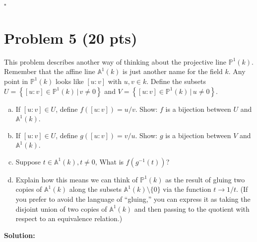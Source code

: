 \documentclass[12pt]{article}
\newcommand{\lc}{\left\{}
\newcommand{\rc}{\right\}}
\begin{document}
\hfill$\square$




\newpage


\section*{Problem 5 \small{(20 pts)}} 


This problem describes another way of thinking about the projective line $\mathbb{P}^1(k)$. Remember that the affine line $\mathbb{A}^1(k)$ is just another name for the field $k$. Any point in $\mathbb{P}^1(k)$ looks like $[u:v]$ with $u,v \in k$. Define the subsets
$ U = \lc [u:v]\in \mathbb{P}^1(k) \,\vert\, v \neq 0  \rc$ and
$ V = \lc [u:v]\in \mathbb{P}^1(k) \,\vert\, u \neq 0  \rc.$
\begin{enumerate}[(a)]
	\item If $[u:v] \in U$, define $f([u:v]) = u/v$. Show: $f$ is a bijection between $U$ and $\mathbb{A}^1(k)$. 
	\item If $[u:v] \in U$, define $g([u:v]) = v/u$. Show: $g$ is a bijection between $V$ and $\mathbb{A}^1(k)$. 
	\item Suppose $t \in \mathbb{A}^1(k), t\neq 0$, What is $f(g^{-1}(t))$?
	\item Explain how this means we can think of $\mathbb{P}^1(k)$ as the result of gluing two copies of $\mathbb{A}^1(k)$ along the subsets $\mathbb{A}^1(k)\setminus \{0\}$ via the function $t \to 1/t$. (If you prefer to avoid the language of ``gluing,'' you can express it as taking the disjoint union of two copies of $\mathbb{A}^1(k)$ and then passing to the quotient with respect to an equivalence relation.) 
\end{enumerate}



\noindent \textbf{Solution:} 
\end{document}
